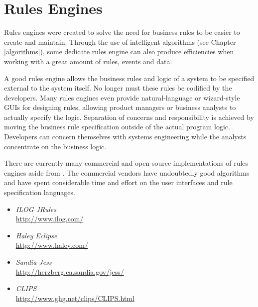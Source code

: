 \section{Rules Engines}

Rules engines were created to solve the need for business rules
to be easier to create and maintain. Through the use of intelligent
algorithms (see Chapter \vref{algorithms}), some dedicate rules engine
can also produce efficiencies when working with a great amount of
rules, events and data.

A good rules engine allows the business rules and logic of a system
to be specified external to the system itself.  No longer must these
rules be codified by the developers.  Many rules engines even provide
natural-language or wizard-style GUIs for designing rules, allowing
product managers or business analysts to actually specify the logic.
Separation of concerns and responsibility is achieved by moving the 
business rule specification outside of the actual program logic.
Developers can
concern themselves with systems engineering while the analysts 
concentrate on the business logic.

There are currently many commercial and open-source implementations
of rules engines aside from \drools{}.  The commercial
vendors have undoubtedly good algorithms and have spent considerable
time and effort on the user interfaces and rule specification
languages.

\begin{itemize}
	\item \emph{ILOG JRules}\\
		 \url{http://www.ilog.com/}
	\item \emph{Haley Eclipse}\\
		 \url{http://www.haley.com/}
	\item \emph{Sandia Jess}\\
		 \url{http://herzberg.ca.sandia.gov/jess/}
	\item \emph{CLIPS}\\
		 \url{http://www.ghg.net/clips/CLIPS.html}
\end{itemize}


